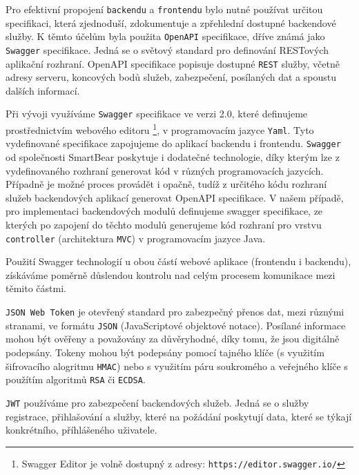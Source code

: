 \documentclass[twoside, 12pt]{article}
\begin{document}
{Pro efektivní propojení \texttt{backendu} a \texttt{frontendu} bylo nutné používat určitou specifikaci,
která zjednoduší, zdokumentuje a zpřehlední dostupné backendové služby.
K těmto účelům byla použita \texttt{OpenAPI} specifikace, dříve známá jako \texttt{Swagger} specifikace.
Jedná se o světový standard pro definování RESTových aplikační rozhraní.
OpenAPI specifikace popisuje dostupné \texttt{REST} služby, včetně adresy serveru,
koncových bodů služeb, zabezpečení, posílaných dat a spoustu dalších informací.
\par
Při vývoji využíváme \texttt{Swagger} specifikace ve verzi 2.0, které definujeme prostřednictvím
webového editoru
\footnote{Swagger Editor je volně dostupný z adresy: \texttt{https://editor.swagger.io/}},
v programovacím jazyce \texttt{Yaml}.
Tyto vydefinované specifikace zapojujeme do aplikací backendu i frontendu.
\texttt{Swagger} od společnosti SmartBear poskytuje i dodatečné technologie,
díky kterým lze z vydefinovaného rozhraní generovat kód v různých programovacích jazycích.
Případně je možné proces provádět i opačně, tudíž z určitého kódu
rozhraní služeb backendových aplikací generovat OpenAPI specifikace.
V našem případě, pro implementaci backendových modulů definujeme swagger specifikace,
ze kterých po zapojení do těchto modulů generujeme kód rozhraní pro vrstvu \texttt{controller}
(architektura \texttt{MVC}) v programovacím jazyce Java.
\par
Použití Swagger technologií u obou částí webové aplikace (frontendu i backendu),
získáváme poměrně důslendou kontrolu nad celým procesem komunikace mezi těmito částmi.

\texttt{JSON Web Token} je otevřený standard pro zabezpečný přenos dat,
mezi různými stranami, ve formátu \texttt{JSON} (JavaScriptové objektové notace).
Posílané informace mohou být ověřeny a považovány za důvěryhodné,
díky tomu, že jsou digitálně podepsány. Tokeny mohou být podepsány
pomocí tajného klíče (s využitím šifrovacího alogritmu \texttt{HMAC}) nebo
s využitím páru soukromého a veřejného klíče s použítím algoritmů \texttt{RSA} či \texttt{ECDSA}.
\cite{jwt}
\par
\texttt{JWT} používáme pro zabezpečení backendových služeb.
Jedná se o služby registrace, přihlašování a služby, které na požádání poskytují
data, které se týkají konkrétního, příhlášeného uživatele.




}
\end{document}
